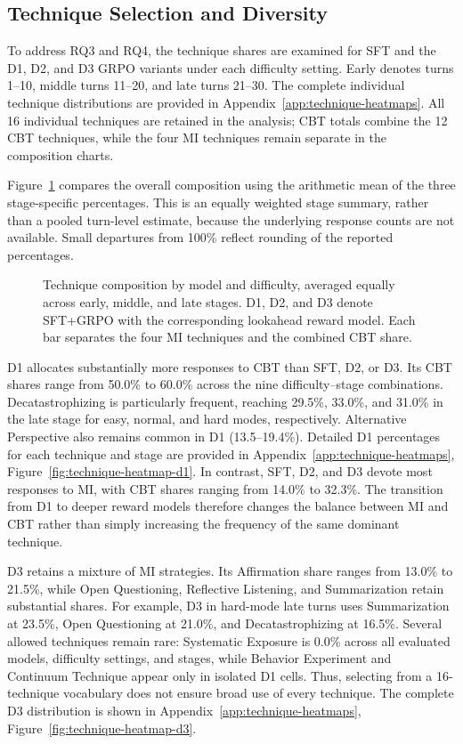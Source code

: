 \subsection{Technique Selection and Diversity}

To address RQ3 and RQ4, the technique shares are examined for SFT and the D1, D2, and D3 GRPO variants under each difficulty setting. Early denotes turns 1--10, middle turns 11--20, and late turns 21--30. The complete individual technique distributions are provided in Appendix~\ref{app:technique-heatmaps}. All 16 individual techniques are retained in the analysis; CBT totals combine the 12 CBT techniques, while the four MI techniques remain separate in the composition charts.

Figure~\ref{fig:technique-mix} compares the overall composition using the arithmetic mean of the three stage-specific percentages. This is an equally weighted stage summary, rather than a pooled turn-level estimate, because the underlying response counts are not available. Small departures from 100\% reflect rounding of the reported percentages.

\begin{figure}[H]
\centering

\caption{Technique composition by model and difficulty, averaged equally across early, middle, and late stages. D1, D2, and D3 denote SFT+GRPO with the corresponding lookahead reward model. Each bar separates the four MI techniques and the combined CBT share.}
\label{fig:technique-mix}
\end{figure}

D1 allocates substantially more responses to CBT than SFT, D2, or D3. Its CBT shares range from 50.0\% to 60.0\% across the nine difficulty--stage combinations. Decatastrophizing is particularly frequent, reaching 29.5\%, 33.0\%, and 31.0\% in the late stage for easy, normal, and hard modes, respectively. Alternative Perspective also remains common in D1 (13.5--19.4\%). Detailed D1 percentages for each technique and stage are provided in Appendix~\ref{app:technique-heatmaps}, Figure~\ref{fig:technique-heatmap-d1}. In contrast, SFT, D2, and D3 devote most responses to MI, with CBT shares ranging from 14.0\% to 32.3\%. The transition from D1 to deeper reward models therefore changes the balance between MI and CBT rather than simply increasing the frequency of the same dominant technique.

D3 retains a mixture of MI strategies. Its Affirmation share ranges from 13.0\% to 21.5\%, while Open Questioning, Reflective Listening, and Summarization retain substantial shares. For example, D3 in hard-mode late turns uses Summarization at 23.5\%, Open Questioning at 21.0\%, and Decatastrophizing at 16.5\%. Several allowed techniques remain rare: Systematic Exposure is 0.0\% across all evaluated models, difficulty settings, and stages, while Behavior Experiment and Continuum Technique appear only in isolated D1 cells. Thus, selecting from a 16-technique vocabulary does not ensure broad use of every technique. The complete D3 distribution is shown in Appendix~\ref{app:technique-heatmaps}, Figure~\ref{fig:technique-heatmap-d3}.

